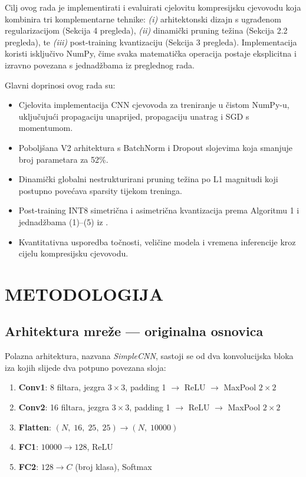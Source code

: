 \documentclass[letterpaper, 10 pt, conference]{ieeeconf}
\begin{document}
Cilj ovog rada je implementirati i evaluirati cjelovitu kompresijsku cjevovodu koja kombinira tri komplementarne tehnike: \textit{(i)} arhitektonski dizajn s ugrađenom regularizacijom (Sekcija 4 pregleda), \textit{(ii)} dinamički pruning težina (Sekcija 2.2 pregleda), te \textit{(iii)} post-training kvantizaciju (Sekcija 3 pregleda).
Implementacija koristi isključivo NumPy, čime svaka matematička operacija postaje eksplicitna i izravno povezana s jednadžbama iz preglednog rada.

Glavni doprinosi ovog rada su:
\begin{itemize}
  \item Cjelovita implementacija CNN cjevovoda za treniranje u čistom NumPy-u, uključujući propagaciju unaprijed, propagaciju unatrag i SGD s momentumom.
  \item Poboljšana V2 arhitektura s BatchNorm i Dropout slojevima koja smanjuje broj parametara za 52\%.
  \item Dinamički globalni nestrukturirani pruning težina po L1 magnitudi koji postupno povećava sparsity tijekom treninga.
  \item Post-training INT8 simetrična i asimetrična kvantizacija prema Algoritmu 1 i jednadžbama (1)--(5) iz \cite{li2023survey}.
  \item Kvantitativna usporedba točnosti, veličine modela i vremena inferencije kroz cijelu kompresijsku cjevovodu.
\end{itemize}

\section{\textbf{METODOLOGIJA}}

\subsection{Arhitektura mreže — originalna osnovica}

Polazna arhitektura, nazvana \textit{SimpleCNN}, sastoji se od dva konvolucijska bloka iza kojih slijede dva potpuno povezana sloja:

\begin{enumerate}
  \item \textbf{Conv1}: 8 filtara, jezgra $3\times3$, padding 1 $\rightarrow$ ReLU $\rightarrow$ MaxPool $2\times2$
  \item \textbf{Conv2}: 16 filtara, jezgra $3\times3$, padding 1 $\rightarrow$ ReLU $\rightarrow$ MaxPool $2\times2$
  \item \textbf{Flatten}: $(N,\;16,\;25,\;25) \rightarrow (N,\;10000)$
  \item \textbf{FC1}: $10000 \rightarrow 128$, ReLU
  \item \textbf{FC2}: $128 \rightarrow C$ (broj klasa), Softmax
\end{enumerate}
\end{document}
